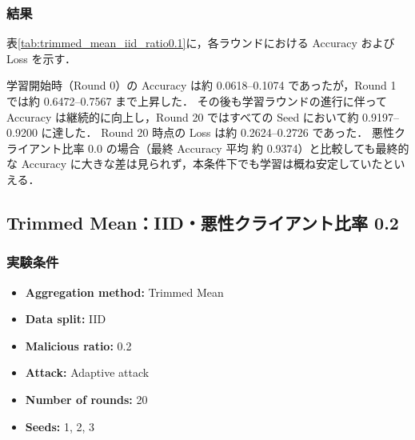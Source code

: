 \documentclass[a4j,twocolumn,dvipdfmx]{jsarticle}
\begin{document}
\subsubsection{結果}

表\ref{tab:trimmed_mean_iid_ratio0.1}に，各ラウンドにおける
Accuracy および Loss を示す．

学習開始時（Round 0）の Accuracy は約 0.0618--0.1074 であったが，Round 1 では約 0.6472--0.7567 まで上昇した． その後も学習ラウンドの進行に伴って Accuracy は継続的に向上し，Round 20 ではすべての Seed において約 0.9197--0.9200 に達した． Round 20 時点の Loss は約 0.2624--0.2726 であった． 悪性クライアント比率 0.0 の場合（最終 Accuracy 平均 約 0.9374）と比較しても最終的な Accuracy に大きな差は見られず，本条件下でも学習は概ね安定していたといえる．

\clearpage
\subsection{Trimmed Mean：IID・悪性クライアント比率 0.2}

\subsubsection{実験条件}

\begin{itemize}
    \item \textbf{Aggregation method:} Trimmed Mean
    \item \textbf{Data split:} IID
    \item \textbf{Malicious ratio:} 0.2
    \item \textbf{Attack:} Adaptive attack
    \item \textbf{Number of rounds:} 20
    \item \textbf{Seeds:} 1, 2, 3
\end{itemize}

\end{document}
